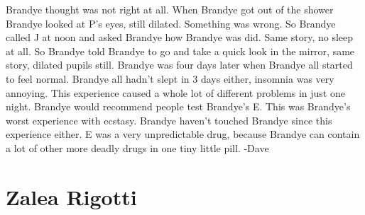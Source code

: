\documentclass[12pt]{book}
\begin{document}
Brandye thought was not right at all. When Brandye got out of the shower Brandye looked at P's eyes, still dilated. Something was wrong. So Brandye called J at noon and asked Brandye how Brandye was did. Same story, no sleep at all. So Brandye told Brandye to go and take a quick look in the mirror, same story, dilated pupils still. Brandye was four days later when Brandye all started to feel normal. Brandye all hadn't slept in 3 days either, insomnia was very annoying. This experience caused a whole lot of different problems in just one night. Brandye would recommend people test Brandye's E. This was Brandye's worst experience with ecstasy. Brandye haven't touched Brandye since this experience either. E was a very unpredictable drug, because Brandye can contain a lot of other more deadly drugs in one tiny little pill. -Dave



\chapter{Zalea Rigotti}
\end{document}
